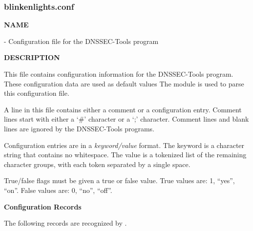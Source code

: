 \clearpage

\subsubsection{blinkenlights.conf}

{\bf NAME}

 - Configuration file for the DNSSEC-Tools
 program

{\bf DESCRIPTION}

This file contains configuration information for the DNSSEC-Tools
 program.  These configuration data are used as default
values The  module is used to parse this configuration file.

A line in this file contains either a comment or a configuration
entry.  Comment lines start with either a `\#' character or a `;' character.
Comment lines and blank lines are ignored by the DNSSEC-Tools programs.

Configuration entries are in a {\it keyword/value} format.  The keyword is a
character string that contains no whitespace.  The value is a tokenized list
of the remaining character groups, with each token separated by a single space.

True/false flags must be given a true or false value.
True values are:  1, ``yes'', ``on''.
False values are:  0, ``no'', ``off''.

{\bf Configuration Records}

The following records are recognized by .

